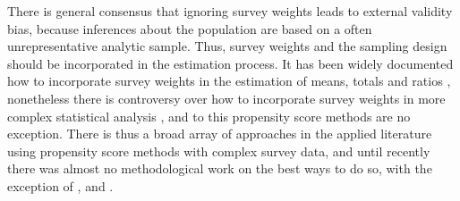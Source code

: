 \documentclass[oupdraft]{bio}
\begin{document}
There is general consensus that ignoring survey weights leads to external validity bias, because inferences about the population are based on a often unrepresentative analytic sample. Thus, survey weights and the sampling design should be incorporated in the estimation process. It has been widely documented how to incorporate survey weights in the estimation of means, totals and ratios \citep[see][]{cochran1977sampling,groves2009survey}, nonetheless there is controversy over how to incorporate survey weights in more complex statistical analysis \citep[see][]{gelman2007struggles}, and to this propensity score methods are no exception. There is thus a broad array of approaches in the applied literature using propensity score methods with complex survey data, and until recently there was almost no methodological work on the best ways to do so, with the exception of \citet{zanutto2006comparison},  \citet{ridgeway2015propensity} and \citet{austin2016propensity}. 
\end{document}
